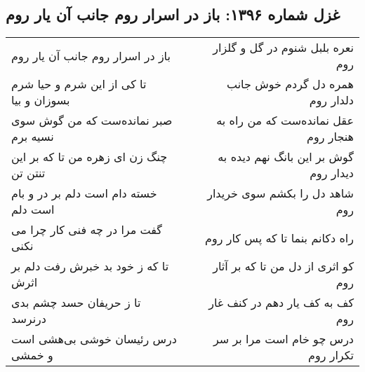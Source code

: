 \begin{center}
\section*{غزل شماره ۱۳۹۶: باز در اسرار روم جانب آن یار روم}
\label{sec:1396}
\begin{longtable}{l p{0.5cm} r}
باز در اسرار روم جانب آن یار روم
&&
نعره بلبل شنوم در گل و گلزار روم
\\
تا کی از این شرم و حیا شرم بسوزان و بیا
&&
همره دل گردم خوش جانب دلدار روم
\\
صبر نمانده‌ست که من گوش سوی نسیه برم
&&
عقل نمانده‌ست که من راه به هنجار روم
\\
چنگ زن ای زهره من تا که بر این تنتن تن
&&
گوش بر این بانگ نهم دیده به دیدار روم
\\
خسته دام است دلم بر در و بام است دلم
&&
شاهد دل را بکشم سوی خریدار روم
\\
گفت مرا در چه فنی کار چرا می نکنی
&&
راه دکانم بنما تا که پس کار روم
\\
تا که ز خود بد خبرش رفت دلم بر اثرش
&&
کو اثری از دل من تا که بر آثار روم
\\
تا ز حریفان حسد چشم بدی درنرسد
&&
کف به کف یار دهم در کنف غار روم
\\
درس رئیسان خوشی بی‌هشی است و خمشی
&&
درس چو خام است مرا بر سر تکرار روم
\\
\end{longtable}
\end{center}
